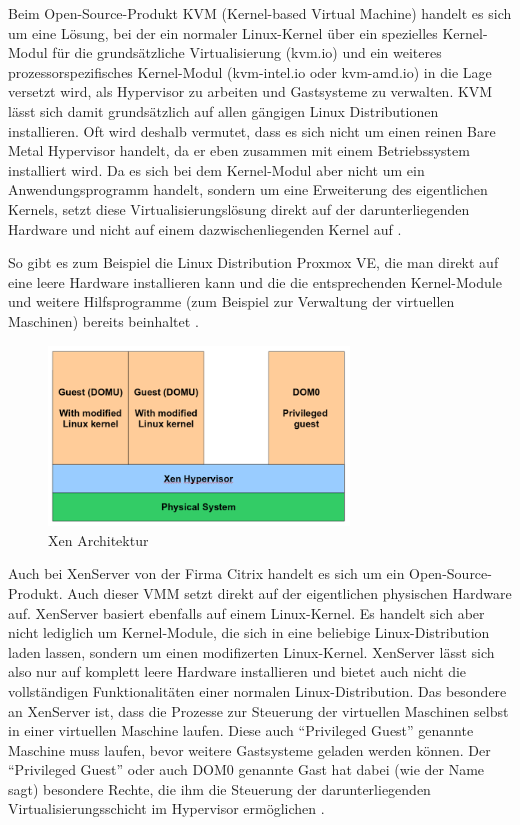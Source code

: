 Beim Open-Source-Produkt KVM (Kernel-based Virtual Machine) handelt es sich um eine Lösung, bei der ein normaler Linux-Kernel über ein spezielles Kernel-Modul für die grundsätzliche Virtualisierung (kvm.io) und ein weiteres prozessorspezifisches Kernel-Modul (kvm-intel.io oder kvm-amd.io) in die Lage versetzt wird, als Hypervisor zu arbeiten und Gastsysteme zu verwalten. KVM lässt sich damit grundsätzlich auf allen gängigen Linux Distributionen installieren. Oft wird deshalb vermutet, dass es sich nicht um einen reinen Bare Metal Hypervisor handelt, da er eben zusammen mit einem Betriebssystem installiert wird. Da es sich bei dem Kernel-Modul aber nicht um ein Anwendungsprogramm handelt, sondern um eine Erweiterung des eigentlichen Kernels, setzt diese Virtualisierungslösung direkt auf der darunterliegenden Hardware und nicht auf einem dazwischenliegenden Kernel auf \citep[Vgl.][S. 225 - 227]{KivKam07}.

So gibt es zum Beispiel die Linux Distribution Proxmox VE, die man direkt auf eine leere Hardware installieren kann und die die entsprechenden Kernel-Module und weitere Hilfsprogramme (zum Beispiel zur Verwaltung der virtuellen Maschinen) bereits beinhaltet \citep[Vgl.][]{Proxmox14}.

\begin{figure}[!ht]
  \begin{center}
    \includegraphics[width=8cm]{bilder/xen.png}
    \caption{Xen Architektur \citep{kvm:002}}
  \end{center}
\end{figure}

Auch bei XenServer von der Firma Citrix handelt es sich um ein Open-Source-Produkt. Auch dieser \ac{VMM} setzt direkt auf der eigentlichen physischen Hardware auf. XenServer basiert ebenfalls auf einem Linux-Kernel. Es handelt sich aber nicht lediglich um Kernel-Module, die sich in eine beliebige Linux-Distribution laden lassen, sondern um einen modifizerten Linux-Kernel. XenServer lässt sich also nur auf komplett leere Hardware installieren und bietet auch nicht die vollständigen Funktionalitäten einer normalen Linux-Distribution. Das besondere an XenServer ist, dass die Prozesse zur Steuerung der virtuellen Maschinen selbst in einer virtuellen Maschine laufen. Diese auch "`Privileged Guest"' genannte Maschine muss laufen, bevor weitere Gastsysteme geladen werden können. Der "`Privileged Guest"' oder auch DOM0 genannte Gast hat dabei (wie der Name sagt) besondere Rechte, die ihm die Steuerung der darunterliegenden Virtualisierungsschicht im Hypervisor ermöglichen \citep[Vgl.][S. 2]{Schee14}.

